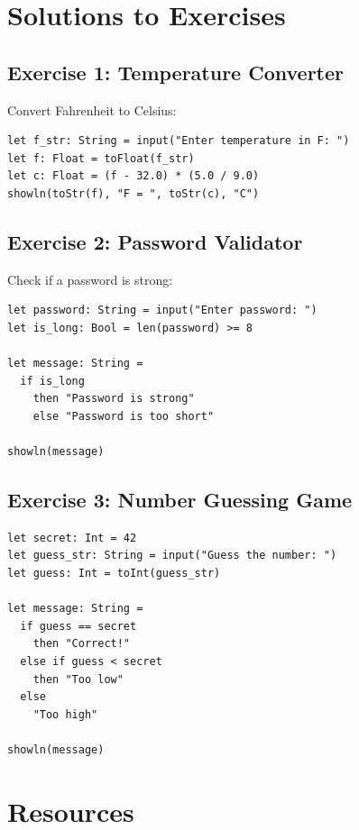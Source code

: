 \documentclass[11pt,twoside,openright]{book}
\begin{document}
\chapter{Solutions to Exercises}

\section{Exercise 1: Temperature Converter}

Convert Fahrenheit to Celsius:

\begin{lstlisting}[language=ConstructLang]
let f_str: String = input("Enter temperature in F: ")
let f: Float = toFloat(f_str)
let c: Float = (f - 32.0) * (5.0 / 9.0)
showln(toStr(f), "F = ", toStr(c), "C")
\end{lstlisting}

\section{Exercise 2: Password Validator}

Check if a password is strong:

\begin{lstlisting}[language=ConstructLang]
let password: String = input("Enter password: ")
let is_long: Bool = len(password) >= 8

let message: String =
  if is_long
    then "Password is strong"
    else "Password is too short"

showln(message)
\end{lstlisting}

\section{Exercise 3: Number Guessing Game}

\begin{lstlisting}[language=ConstructLang]
let secret: Int = 42
let guess_str: String = input("Guess the number: ")
let guess: Int = toInt(guess_str)

let message: String =
  if guess == secret
    then "Correct!"
  else if guess < secret
    then "Too low"
  else
    "Too high"

showln(message)
\end{lstlisting}

\chapter{Resources}
\end{document}
